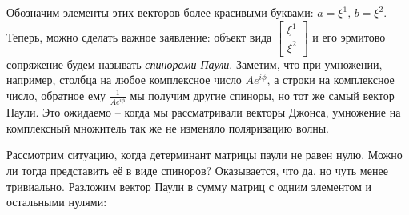 Обозначим элементы этих векторов более красивыми буквами: $a = \xi^1,\, b = \xi^2$. Теперь, можно сделать важное заявление: объект вида $\begin{bmatrix} \xi^1 \\ \xi^2 \end{bmatrix}$ и его эрмитово сопряжение будем называть \textit{спинорами Паули}. Заметим, что при умножении, например, столбца на любое комплексное число $Ae^{i\phi}$, а строки на комплексное число, обратное ему $\frac{1}{Ae^{i\phi}}$ мы получим другие спиноры, но тот же самый вектор Паули. Это ожидаемо -- когда мы рассматривали векторы Джонса, умножение на комплексный множитель так же не изменяло поляризацию волны. 

Рассмотрим ситуацию, когда детерминант матрицы паули не равен нулю. Можно ли тогда представить её в виде спиноров? Оказывается, что да, но чуть менее тривиально. Разложим вектор Паули в сумму матриц с одним элементом и остальными нулями:
